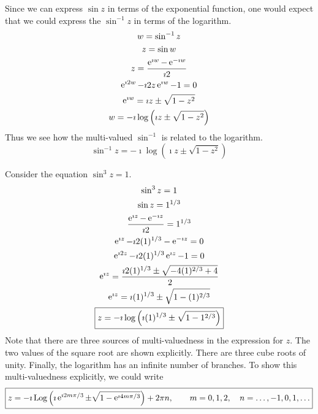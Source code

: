 \begin{Example}
  Since we can express $\sin z$ in terms of the exponential function, one
  would expect that we could express the $\sin^{-1} z$ in terms of the
  logarithm.
  \begin{gather*}
    w =  \sin^{-1} z 
    \\
    z =  \sin w 
    \\
    z =  \frac{\mathop{\mathrm{e}}\nolimits^{\imath w} - \mathop{\mathrm{e}}\nolimits^{-\imath w}}{\imath 2} 
    \\
    \mathop{\mathrm{e}}\nolimits^{\imath 2 w} - \imath 2 z \mathop{\mathrm{e}}\nolimits^{\imath w} - 1 = 0 
    \\
    \mathop{\mathrm{e}}\nolimits^{\imath w} =  \imath z \pm \sqrt{1 - z^2} 
    \\
    w =  -\imath \log \left( \imath z \pm \sqrt{1 - z^2} \right)
  \end{gather*}
  Thus we see how the multi-valued $\sin^{-1}$ is related to the logarithm.
  \[
  \boxed{
    \sin^{-1} z =  - \imath \log \left( \imath z \pm \sqrt{1 - z^2} \right)
    }
  \]
\end{Example}











\begin{Example}
  Consider the equation $\sin^3 z = 1$.
  \begin{gather*}
    \sin^3 z = 1 
    \\
    \sin z = 1^{1/3} 
    \\
    \frac{\mathop{\mathrm{e}}\nolimits^{\imath z} - \mathop{\mathrm{e}}\nolimits^{-\imath z}}{\imath 2} = 1^{1/3} 
    \\
    \mathop{\mathrm{e}}\nolimits^{\imath z} - \imath 2 (1)^{1/3} - \mathop{\mathrm{e}}\nolimits^{-\imath z} = 0 
    \\
    \mathop{\mathrm{e}}\nolimits^{\imath 2 z} - \imath 2 (1)^{1/3} \mathop{\mathrm{e}}\nolimits^{\imath z} - 1 = 0 
    \\
    \mathop{\mathrm{e}}\nolimits^{\imath z} = \frac{\imath 2 (1)^{1/3} \pm \sqrt{-4 (1)^{2/3} + 4}}{2} 
    \\
    \mathop{\mathrm{e}}\nolimits^{\imath z} = \imath (1)^{1/3} \pm \sqrt{1 - (1)^{2/3}} 
    \\
    \boxed{ 
      z = - \imath \log\left(\imath (1)^{1/3} \pm \sqrt{1 - 1^{2/3}}\right) 
      }
  \end{gather*}
  Note that there are three sources of multi-valuedness in the expression for
  $z$.  The two values of the square root are shown explicitly.  There are
  three cube roots of unity.  Finally, the logarithm has an infinite
  number of branches.  To show this multi-valuedness explicitly, we could write
  \[ 
  \boxed{ 
    z = - \imath \mathop{\mathrm{Log}}\nolimits\left(\imath \mathop{\mathrm{e}}\nolimits^{\imath 2 m \pi / 3} \pm \sqrt{1 - \mathop{\mathrm{e}}\nolimits^{\imath 4 m \pi / 3}}\right)
    + 2 \pi n, \qquad m = 0, 1, 2, \quad n = \ldots, -1, 0, 1, \ldots 
    } 
  \]
\end{Example}









